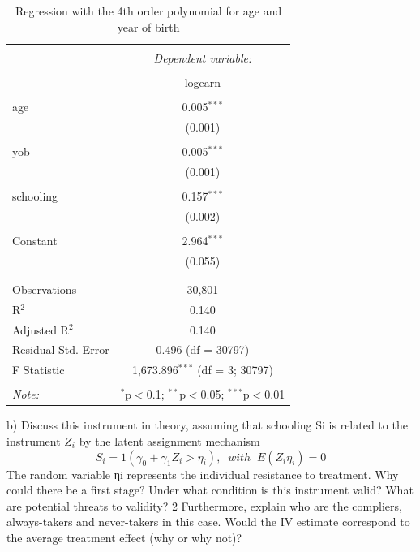 \documentclass[a4paper,12pt,oneside,English]{article}
\begin{document}
\begin{table}[!htbp] \centering 
  \caption{Regression with the 4th order polynomial for age and year of birth} 
  \label{reg 2} 
\begin{tabular}{@{\extracolsep{5pt}}lc} 
\\[-1.8ex]\hline 
\hline \\[-1.8ex] 
 & \multicolumn{1}{c}{\textit{Dependent variable:}} \\ 
\cline{2-2} 
\\[-1.8ex] & logearn \\ 
\hline \\[-1.8ex] 
 age & 0.005$^{***}$ \\ 
  & (0.001) \\ 
  & \\ 
 yob & 0.005$^{***}$ \\ 
  & (0.001) \\ 
  & \\ 
 schooling & 0.157$^{***}$ \\ 
  & (0.002) \\ 
  & \\ 
 Constant & 2.964$^{***}$ \\ 
  & (0.055) \\ 
  & \\ 
\hline \\[-1.8ex] 
Observations & 30,801 \\ 
R$^{2}$ & 0.140 \\ 
Adjusted R$^{2}$ & 0.140 \\ 
Residual Std. Error & 0.496 (df = 30797) \\ 
F Statistic & 1,673.896$^{***}$ (df = 3; 30797) \\ 
\hline 
\hline \\[-1.8ex] 
\textit{Note:}  & \multicolumn{1}{r}{$^{*}$p$<$0.1; $^{**}$p$<$0.05; $^{***}$p$<$0.01} \\ 
\end{tabular} 
\end{table} 
b) Discuss this instrument in theory, assuming that schooling Si is related to the instrument $Z_i$ by the latent assignment mechanism
\begin{equation*}
    S_i = 1(\gamma_0+ \gamma_1 Z_i > \eta_i),\;\; with\;\; E(Z_i \eta _i) = 0
\end{equation*}
The random variable ηi represents the individual resistance to treatment. Why could there be a
first stage? Under what condition is this instrument valid? What are potential threats to validity?
 2
Furthermore, explain who are the compliers, always-takers and never-takers in this case. Would the IV estimate correspond to the average treatment effect (why or why not)?
\end{document}
